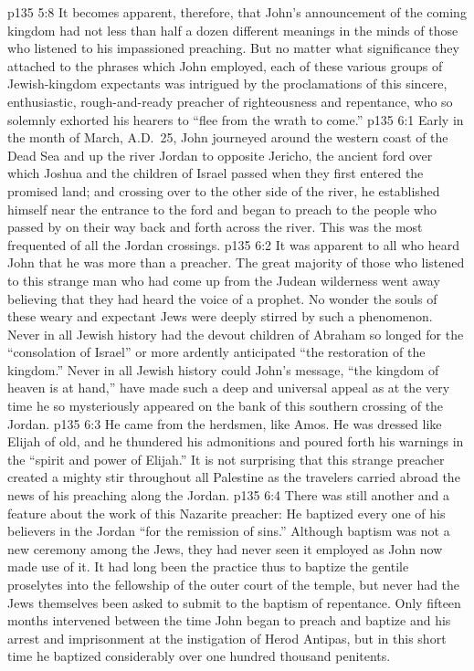 \vs p135 5:8 It becomes apparent, therefore, that John’s announcement of the coming kingdom had not less than half a dozen different meanings in the minds of those who listened to his impassioned preaching. But no matter what significance they attached to the phrases which John employed, each of these various groups of Jewish\hyp{}kingdom expectants was intrigued by the proclamations of this sincere, enthusiastic, rough\hyp{}and\hyp{}ready preacher of righteousness and repentance, who so solemnly exhorted his hearers to “flee from the wrath to come.”
\vs p135 6:1 Early in the month of March, A.D.~25, John journeyed around the western coast of the Dead Sea and up the river Jordan to opposite Jericho, the ancient ford over which Joshua and the children of Israel passed when they first entered the promised land; and crossing over to the other side of the river, he established himself near the entrance to the ford and began to preach to the people who passed by on their way back and forth across the river. This was the most frequented of all the Jordan crossings.
\vs p135 6:2 It was apparent to all who heard John that he was more than a preacher. The great majority of those who listened to this strange man who had come up from the Judean wilderness went away believing that they had heard the voice of a prophet. No wonder the souls of these weary and expectant Jews were deeply stirred by such a phenomenon. Never in all Jewish history had the devout children of Abraham so longed for the “consolation of Israel” or more ardently anticipated “the restoration of the kingdom.” Never in all Jewish history could John’s message, “the kingdom of heaven is at hand,” have made such a deep and universal appeal as at the very time he so mysteriously appeared on the bank of this southern crossing of the Jordan.
\vs p135 6:3 He came from the herdsmen, like Amos. He was dressed like Elijah of old, and he thundered his admonitions and poured forth his warnings in the “spirit and power of Elijah.” It is not surprising that this strange preacher created a mighty stir throughout all Palestine as the travelers carried abroad the news of his preaching along the Jordan.
\vs p135 6:4 There was still another and a  feature about the work of this Nazarite preacher: He baptized every one of his believers in the Jordan “for the remission of sins.” Although baptism was not a new ceremony among the Jews, they had never seen it employed as John now made use of it. It had long been the practice thus to baptize the gentile proselytes into the fellowship of the outer court of the temple, but never had the Jews themselves been asked to submit to the baptism of repentance. Only fifteen months intervened between the time John began to preach and baptize and his arrest and imprisonment at the instigation of Herod Antipas, but in this short time he baptized considerably over one hundred thousand penitents.
